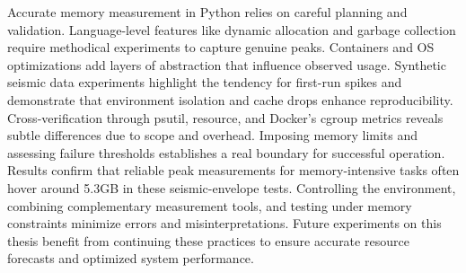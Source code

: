 Accurate memory measurement in Python relies on careful planning and validation.
Language-level features like dynamic allocation and garbage collection require methodical experiments to capture genuine peaks.
Containers and \ac{OS} optimizations add layers of abstraction that influence observed usage.
Synthetic seismic data experiments highlight the tendency for first-run spikes and demonstrate that environment isolation and cache drops enhance reproducibility.
Cross-verification through psutil, resource, and Docker's cgroup metrics reveals subtle differences due to scope and overhead.
Imposing memory limits and assessing failure thresholds establishes a real boundary for successful operation.
Results confirm that reliable peak measurements for memory-intensive tasks often hover around 5.3\ac{GB} in these seismic-envelope tests.
Controlling the environment, combining complementary measurement tools, and testing under memory constraints minimize errors and misinterpretations.
Future experiments on this thesis benefit from continuing these practices to ensure accurate resource forecasts and optimized system performance.